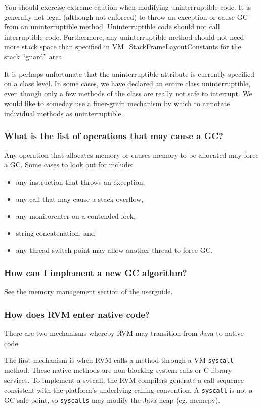 You should exercise extreme caution when modifying uninterruptible code.  It
is generally not legal (although not enforced) to throw an exception or 
cause GC from an uninterruptible method.  Uninterruptible code should not
call interruptible code. Furthermore, any uninterruptible method should
not need more stack space than specified in VM\_StackFrameLayoutConstants
for the stack ``guard'' area.

It is perhaps unfortunate that the uninterruptible attribute is currently
specified on a class level.  In some cases, we have declared an entire
class uninterruptible, even though only a few methods of the class are
really not safe to interrupt.  We would like to someday use a finer-grain
mechanism by which to annotate individual methods as uninterruptible.

\subsubsection{What is the list of operations that may cause a GC?}

Any operation that allocates memory or causes memory to be allocated may
force a GC.  Some cases to look out for include:
\begin{itemize}
\item any instruction that throws an exception,
\item any call that may cause a stack overflow,
\item any monitorenter on a contended lock,
\item string concatenation, and
\item any thread-switch point may allow another thread to force GC.
\end{itemize}

\subsubsection{How can I implement a new GC algorithm?}

See the memory management section of the userguide.

\subsubsection{How does RVM enter native code?}

There are two mechanisms whereby RVM may transition from Java to native
code.

The first mechanism is when RVM calls a method through a VM {\tt syscall}
method.  These native methods are non-blocking system calls or C library 
services.  To implement a syscall, the RVM compilers generate a call
sequence consistent with the platform's underlying calling convention.
A {\tt syscall} is not a GC-safe point, so {\tt syscalls} may modify the
Java heap (eg. memcpy).

